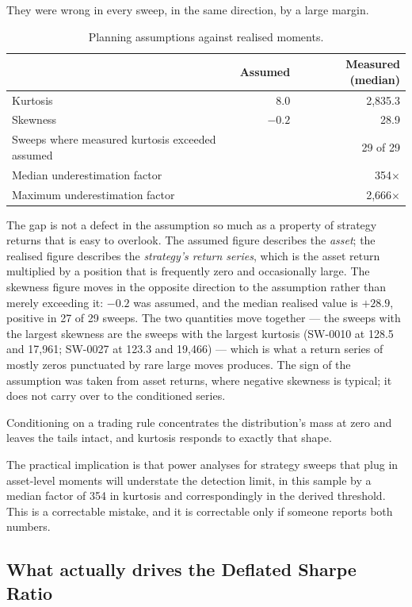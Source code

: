 \documentclass[11pt,a4paper]{article}
\begin{document}
They were wrong in every sweep, in the same direction, by a large margin.

\begin{table}[ht]
\centering
\small
\begin{tabular}{lrr}
\toprule
& Assumed & Measured (median) \\
\midrule
Kurtosis & 8.0 & 2{,}835.3 \\
Skewness & $-0.2$ & 28.9 \\
\midrule
Sweeps where measured kurtosis exceeded assumed & \multicolumn{2}{r}{29 of 29} \\
Median underestimation factor & \multicolumn{2}{r}{354$\times$} \\
Maximum underestimation factor & \multicolumn{2}{r}{2{,}666$\times$} \\
\bottomrule
\end{tabular}
\caption{Planning assumptions against realised moments.}
\end{table}

The gap is not a defect in the assumption so much as a property of strategy
returns that is easy to overlook. The assumed figure describes the
\emph{asset}; the realised figure describes the \emph{strategy's return
series}, which is the asset return multiplied by a position that is frequently
zero and occasionally large. The skewness figure moves in the opposite direction to the assumption rather
than merely exceeding it: $-0.2$ was assumed, and the median realised value is
$+28.9$, positive in 27 of 29 sweeps. The two quantities move together --- the
sweeps with the largest skewness are the sweeps with the largest kurtosis
(SW-0010 at 128.5 and 17{,}961; SW-0027 at 123.3 and 19{,}466) --- which is
what a return series of mostly zeros punctuated by rare large moves produces.
The sign of the assumption was taken from asset returns, where negative
skewness is typical; it does not carry over to the conditioned series.

Conditioning on a trading rule concentrates the
distribution's mass at zero and leaves the tails intact, and kurtosis responds
to exactly that shape.

The practical implication is that power analyses for strategy sweeps that
plug in asset-level moments will understate the detection limit, in this
sample by a median factor of 354 in kurtosis and correspondingly in the
derived threshold. This is a correctable mistake, and it is correctable only
if someone reports both numbers.

\subsection{What actually drives the Deflated Sharpe Ratio}
\end{document}
